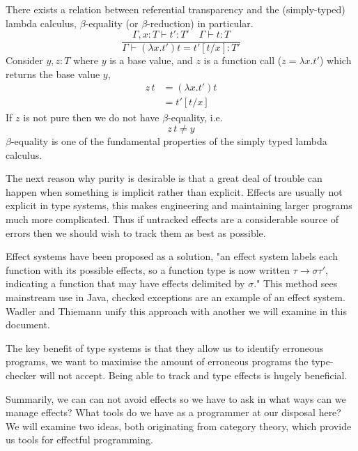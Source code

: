 There exists a relation between referential transparency and
the (simply-typed) lambda calculus,
$\beta$-equality (or $\beta$-reduction) in particular.
\begin{equation}
\frac
{\Gamma, x : T \vdash t\prime : T\prime \quad \Gamma \vdash t : T}
{\Gamma \vdash (\lambda x.t\prime)t = t\prime[t/x]: T\prime }
\end{equation}
Consider $y, z : T$ where $y$ is a base value,
and $z$ is a function call ($z = \lambda x.t\prime$)
which returns the base value $y$,
\begin{align}
    z\,t &= (\lambda x.t\prime)t \\
         &= t\prime[t/x]
\end{align}
If $z$ is not pure then we do not have $\beta$-equality, i.e.
\begin{equation}
    z\,t \neq y
\end{equation}
$\beta$-equality is one of the fundamental properties
of the simply typed lambda calculus.

The next reason why purity is desirable is that
a great deal of trouble can happen when something is implicit
rather than explicit.
Effects are usually not explicit in type systems,
this makes engineering and
maintaining larger programs
much more complicated.
Thus if untracked effects are a considerable source of errors then we should
wish to track them as best as possible.

Effect systems\cite{lucassen1988polymorphic} have been proposed as a solution,
"an effect system labels each function with its possible effects,
so a function type is now written $\tau \rightarrow \sigma \tau\prime$,
indicating a function that may have effects delimited by $\sigma$."
This method sees mainstream use in Java,
checked exceptions are an example of an effect system.
Wadler and Thiemann\cite{wadler2003marriage}
unify this approach with another we will examine in this document.

The key benefit of type systems is that they allow us to identify erroneous programs,
we want to maximise the amount of erroneous programs the type-checker will not accept.
Being able to track and type effects is hugely beneficial.

Summarily, we can can not avoid effects so
we have to ask in what ways can we manage effects?
What tools do we have as a programmer at our disposal here?
We will examine two ideas, both originating from category theory,
which provide us tools for effectful programming.

